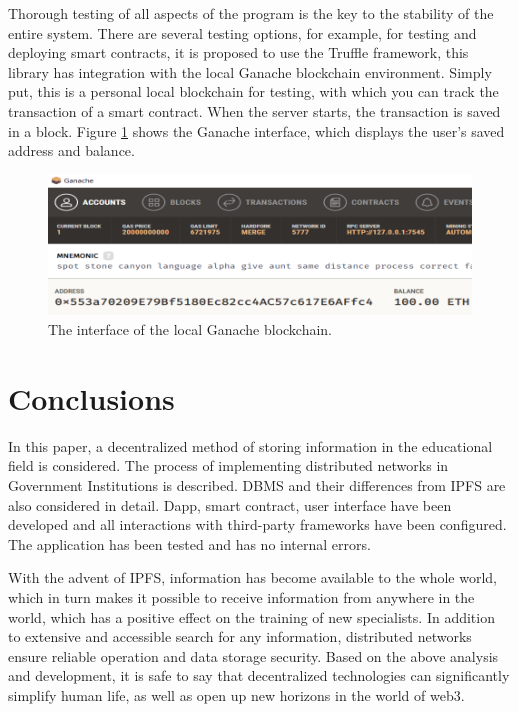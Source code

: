 \documentclass[10pt,conference,a4paper]{IEEEtran_EDM}
\begin{document}
Thorough testing of all aspects of the program is the key to the stability of the entire system. There are several testing options, for example, for testing and deploying smart contracts, it is proposed to use the Truffle framework, this library has integration with the local Ganache blockchain environment. Simply put, this is a personal local blockchain for testing, with which you can track the transaction of a smart contract. When the server starts, the transaction is saved in a block. Figure \ref{GanacheB} shows the Ganache interface, which displays the user's saved address and balance.

\begin{figure}[htbp]
\centerline{\includegraphics[scale=0.51]{fig3.png}}
\caption{The interface of the local Ganache blockchain.}
\label{GanacheB}
\end{figure}

\section{Conclusions }
In this paper, a decentralized method of storing information in the educational field is considered. The process of implementing distributed networks in Government Institutions is described. DBMS and their differences from IPFS are also considered in detail. Dapp, smart contract, user interface have been developed and all interactions with third-party frameworks have been configured. The application has been tested and has no internal errors.

With the advent of IPFS, information has become available to the whole world, which in turn makes it possible to receive information from anywhere in the world, which has a positive effect on the training of new specialists. In addition to extensive and accessible search for any information, distributed networks ensure reliable operation and data storage security.   Based on the above analysis and development, it is safe to say that decentralized technologies can significantly simplify human life, as well as open up new horizons in the world of web3.
\end{document}
